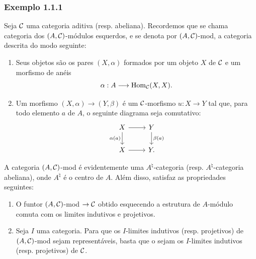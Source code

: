 \subsubsection*{Exemplo 1.1.1}
Seja $\mathcal C$ uma categoria aditiva (resp. abeliana). Recordemos que se chama categoria dos $(A,\mathcal C)$-módulos esquerdos, e se denota por $(A,\mathcal C)$-mod, a categoria descrita do modo seguinte:
\begin{enumerate}[label=(\roman*)]
\item Seus objetos são os pares $(X,\alpha)$ formados por um objeto $X$ de $\mathcal C$ e um morfismo de anéis
\[
\alpha:A\longrightarrow \operatorname{Hom}_{\mathcal C}(X,X).
\]
\item Um morfismo $(X,\alpha)\to(Y,\beta)$ é um $\mathcal C$-morfismo $u:X\to Y$ tal que, para todo elemento $a$ de $A$, o seguinte diagrama seja comutativo:
\[
\begin{tikzcd}
X \arrow[r] \arrow[d,"\alpha(a)"'] & Y \arrow[d,"\beta(a)"]\\
X \arrow[r] & Y .
\end{tikzcd}
\]
\end{enumerate}
A categoria $(A,\mathcal C)$-mod é evidentemente uma $A^{\natural}$-categoria (resp. $A^{\natural}$-categoria abeliana), onde $A^{\natural}$ é o centro de $A$. Além disso, satisfaz as propriedades seguintes:
\begin{enumerate}[label=(\alph*)]
\item O funtor $(A,\mathcal C)$-mod $\to\mathcal C$ obtido esquecendo a estrutura de $A$-módulo comuta com os limites indutivos e projetivos.
\item Seja $I$ uma categoria. Para que os $I$-limites indutivos (resp. projetivos) de $(A,\mathcal C)$-mod sejam representáveis, basta que o sejam os $I$-limites indutivos (resp. projetivos) de $\mathcal C$.
\end{enumerate}
